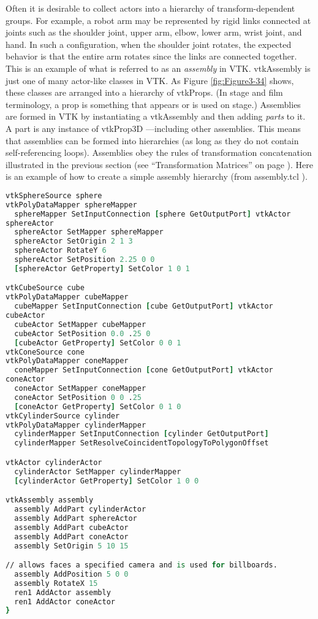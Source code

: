 Often it is desirable to collect actors into a hierarchy of transform-dependent groups. For example, a robot arm may be represented by rigid links connected at joints such as the shoulder joint, upper arm, elbow, lower arm, wrist joint, and hand. In such a configuration, when the shoulder joint rotates, the expected behavior is that the entire arm rotates since the links are connected together. This is an example of what is referred to as an \emph{assembly} in VTK. vtkAssembly is just one of many actor-like classes in VTK. As Figure \ref{fig:Figure3-34} shows, these classes are arranged into a hierarchy of vtkProps. (In stage and film terminology, a prop is something that appears or is used on stage.) Assemblies are formed in VTK by instantiating a vtkAssembly and then adding \emph{parts} to it. A part is any instance of vtkProp3D ---including other assemblies. This means that assemblies can be formed into hierarchies (as long as they do not contain self-referencing loops). Assemblies obey the rules of transformation concatenation illustrated in the previous section (see ``Transformation Matrices'' on page \pageref{subsubsec:transform_matrices} ). Here is an example of how to create a simple assembly hierarchy (from assembly.tcl ).

\begin{lstlisting}[language=TCL, caption={Part of assembly.tcl}]
vtkSphereSource sphere
vtkPolyDataMapper sphereMapper
  sphereMapper SetInputConnection [sphere GetOutputPort] vtkActor
sphereActor
  sphereActor SetMapper sphereMapper
  sphereActor SetOrigin 2 1 3
  sphereActor RotateY 6
  sphereActor SetPosition 2.25 0 0
  [sphereActor GetProperty] SetColor 1 0 1

vtkCubeSource cube
vtkPolyDataMapper cubeMapper
  cubeMapper SetInputConnection [cube GetOutputPort] vtkActor
cubeActor
  cubeActor SetMapper cubeMapper
  cubeActor SetPosition 0.0 .25 0
  [cubeActor GetProperty] SetColor 0 0 1
vtkConeSource cone
vtkPolyDataMapper coneMapper
  coneMapper SetInputConnection [cone GetOutputPort] vtkActor
coneActor
  coneActor SetMapper coneMapper
  coneActor SetPosition 0 0 .25
  [coneActor GetProperty] SetColor 0 1 0
vtkCylinderSource cylinder
vtkPolyDataMapper cylinderMapper
  cylinderMapper SetInputConnection [cylinder GetOutputPort]
  cylinderMapper SetResolveCoincidentTopologyToPolygonOffset

vtkActor cylinderActor
  cylinderActor SetMapper cylinderMapper
  [cylinderActor GetProperty] SetColor 1 0 0

vtkAssembly assembly
  assembly AddPart cylinderActor
  assembly AddPart sphereActor
  assembly AddPart cubeActor
  assembly AddPart coneActor
  assembly SetOrigin 5 10 15

// allows faces a specified camera and is used for billboards.
  assembly AddPosition 5 0 0
  assembly RotateX 15
  ren1 AddActor assembly
  ren1 AddActor coneActor
}
\end{lstlisting}

